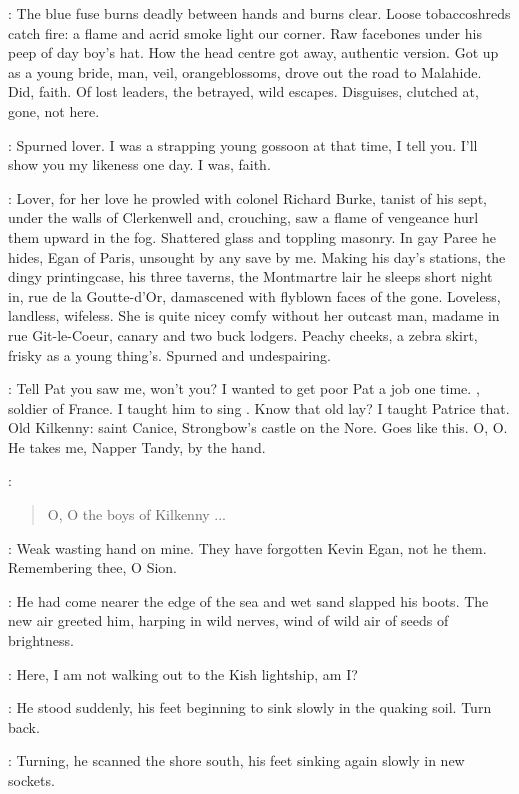 \StephenInt:
The blue fuse burns deadly between hands and burns clear.
Loose tobaccoshreds catch fire:
a flame and acrid smoke light our corner.
Raw facebones under his peep of day boy's hat.
How the head centre got away,
authentic version.
Got up as a young bride,
man, veil, orangeblossoms,
drove out the road to Malahide.
Did, faith.
Of lost leaders, the betrayed, wild escapes.
Disguises, clutched at, gone, not here.

\kevin:
Spurned lover.
I was a strapping young gossoon at that time, I tell you.
I'll show you my likeness one day.
I was, faith.

\StephenInt:
Lover,
for her love
he prowled with colonel Richard Burke,
tanist of his sept,
under the walls of Clerkenwell
and, crouching,
saw a flame of vengeance hurl them upward in the fog.
Shattered glass and toppling masonry.
In gay Paree he hides,
Egan of Paris,
unsought by any save by me.
Making his day's stations,
the dingy printingcase,
his three taverns,
the Montmartre lair he sleeps short night in,
rue de la Goutte-d'Or,
damascened with flyblown faces of the gone.
Loveless, landless, wifeless.
She is quite nicey comfy without her outcast man,
madame in rue Git-le-Coeur,
canary and two buck lodgers.
Peachy cheeks, a zebra skirt, frisky as a young thing's.
Spurned and undespairing.

\mrsegan:
Tell Pat you saw me, won't you?
I wanted to get poor Pat a job one time.
, soldier of France.
I taught him to sing
.
Know that old lay?
I taught Patrice that.
Old Kilkenny:
saint Canice, Strongbow's castle on the Nore.
Goes like this.
O, O.
He takes me, Napper Tandy, by the hand.

\mrsegan:
\begin{verse}
    O, O the boys of Kilkenny ...
\end{verse}

\StephenInt:
Weak wasting hand on mine.
They have forgotten Kevin Egan,
not he them.
Remembering thee, O Sion.

:
He had come nearer the edge of the sea and wet sand slapped his boots.
The new air greeted him, harping in wild nerves,
wind of wild air
of seeds of brightness.

\StephenInt:
Here,
I am not walking out to the Kish lightship,
am I?

:
He stood suddenly,
his feet beginning to sink slowly in the quaking soil.
Turn back.

:
Turning, he scanned the shore south,
his feet sinking again slowly in new sockets.


